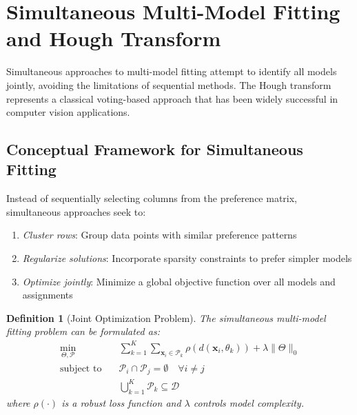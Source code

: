 \documentclass[12pt]{article}
\renewcommand{\vec}[1]{\mathbf{#1}}
\newtheorem{definition}[theorem]{Definition}
\begin{document}
\newpage

\section{Simultaneous Multi-Model Fitting and Hough Transform}
\label{sec:simultaneous_fitting}

Simultaneous approaches to multi-model fitting attempt to identify all models jointly, avoiding the limitations of sequential methods. The Hough transform represents a classical voting-based approach that has been widely successful in computer vision applications.

\subsection{Conceptual Framework for Simultaneous Fitting}
\label{subsec:simultaneous_framework}

Instead of sequentially selecting columns from the preference matrix, simultaneous approaches seek to:
\begin{enumerate}
    \item \textit{Cluster rows}: Group data points with similar preference patterns
    \item \textit{Regularize solutions}: Incorporate sparsity constraints to prefer simpler models
    \item \textit{Optimize jointly}: Minimize a global objective function over all models and assignments
\end{enumerate}

\begin{definition}[Joint Optimization Problem]
    \label{def:joint_optimization}
    The simultaneous multi-model fitting problem can be formulated as:
    \begin{align}
        \min_{\Theta, \mathcal{P}} \quad & \sum_{k=1}^K \sum_{\vec{x}_i \in \mathcal{P}_k} \rho(d(\vec{x}_i, \theta_k)) + \lambda \|\Theta\|_0 \label{eq:joint_objective} \\
        \text{subject to} \quad          & \mathcal{P}_i \cap \mathcal{P}_j = \emptyset \quad \forall i \neq j \label{eq:joint_constraint1}                               \\
                                         & \bigcup_{k=1}^K \mathcal{P}_k \subseteq \mathcal{D} \label{eq:joint_constraint2}
    \end{align}
    where $\rho(\cdot)$ is a robust loss function and $\lambda$ controls model complexity.
\end{definition}
\end{document}
